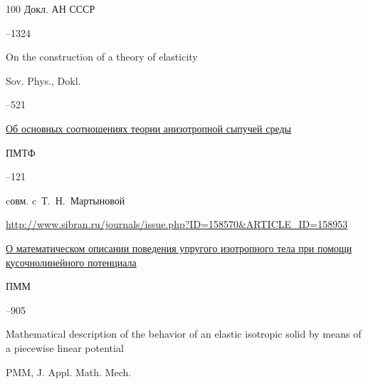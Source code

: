 \begin{thebibliography}{100}
\jour Докл. АН СССР




–1324


\transl


\paper On the construction of a theory of elasticity

\jour Sov. Phys., Dokl. 


--521 







\paper \href{https://zbmath.org/?q=an:0139.19404}{Об основных соотношениях теории анизотропной сыпучей среды}

\jour ПМТФ



–121 

\miscnote cовм. c~Т.~Н.~Мартыновой


\elink \url{http://www.sibran.ru/journals/issue.php?ID=158570&ARTICLE_ID=158953}




\paper \href{https://zbmath.org/?q=an:0113.17602}{О математическом описании поведения упругого изотропного тела при помощи кусочнолинейного потенциала}

\jour ПММ




–905


\transl


\paper Mathematical description of the behavior of an elastic isotropic solid by means of a piecewise linear potential

\jour PMM, J. Appl. Math. Mech. 



\end{thebibliography}
